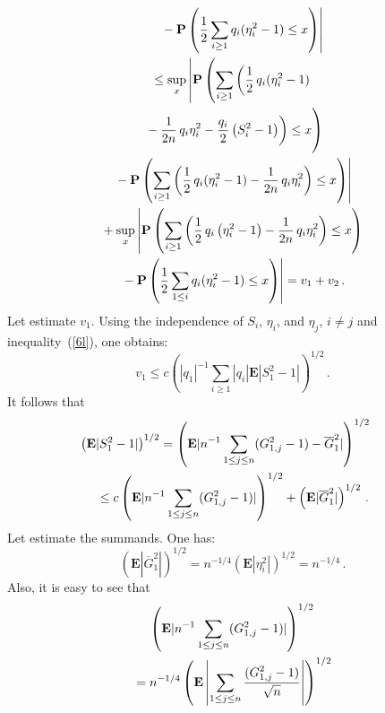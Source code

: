 \begin{multicols}{2}
\noindent
        \begin{multline}
\label{12-y}
\hspace*{5mm}\left.    {}-
    \mathbf{P}\left(\fr{1}{2}\sum\limits_{i\geq 1}q_i(\eta_i^{2}-1)\leq
    x\right)\right\vert \\
{}\leq\sup\limits_{x}\left\vert\mathbf{P}\left(\sum\limits_{i\geq 1}\left(\fr{1}{2}\,q_i
    (\eta_i^{2}-1)\right.\right.\right.\\
\left.\left.    {}-
    \fr{1}{2n}\,q_i\eta_i^{2}-\fr{q_i}{2}\left(S_i^{2}-1\right)
    \right)\leq x     
    \vphantom{\sum\limits_{i\leq1}}
    \right)\\
\left.    {}-
    \mathbf{P}\left(\sum\limits_{i\geq 1}\left(\fr{1}{2}\,q_i(\eta_i^{2}-1)-
    \fr{1}{2n}\,q_i\eta_i^{2}\right)\leq x\right)\right\vert
\\
  {}+\sup\limits_{x}\left\vert\mathbf{P}\left(\sum\limits_{i\geq 1}\left(\fr{1}{2}\,q_i
  \left(\eta_i^{2}-1\right)-
    \fr{1}{2n}\,q_i\eta_i^{2}\right)\leq x\right)\right.\\
\left.    {}-
    \mathbf{P}\left(\fr{1}{2}\sum\limits_{1\leq i}q_i(\eta_i^{2}-1)\leq
    x\right)\right\vert=  v_1+v_2\,.
    \end{multline}
    Let estimate $v_1.$ Using the independence of $S_i$,  $\eta_i$,  and $\eta_j$, $i \neq j$
    and inequality~(\ref{6l}), one obtains:
    $$
    v_1\leq c\left(|q_1|^{-1}\sum\limits_{i\geq 1}|q_i|\mathbf{E}|S_1^{2}-1|\right)^{{1}/{2}}\,.
    $$
    It follows that
    \begin{multline*}
\hspace*{-11.82176pt}\left(\mathbf{E}|S_1^{2}-1|\right)^{{1}/{2}}=\left(\mathbf{E}|
    n^{-1}\sum_{1\leq j\leq n}(G_{1,j}^{2}-1)-\overline{G}_1^{2}|\right)^{{1}/{2}}\\
    {}\leq
    c\left(\mathbf{E}|
    n^{-1}\sum\limits_{1\leq j\leq
    n}(G_{1,j}^{2}-1)|\right)^{{1}/{2}}+\left(\mathbf{E}|\overline{G}_1^{2}|\right)^{{1}/{2}}\,.
    \end{multline*}
    Let estimate the summands. One has:
    $$
    \left(\mathbf{E}|  \overline{G}_1^{2}|\right)^{{1}/{2}}=n^{-1/4}\left(\mathbf{E}|
    \eta_i^{2}|\right)^{{1}/{2}}=n^{-1/4}\,.
    $$
    Also, it is easy to see that
    \begin{multline*}
    \left(\mathbf{E}|n^{-1}\sum\limits_{1\leq j\leq
    n}(G_{1,j}^{2}-1)|\right)^{{1}/{2}}\\
    {}=
    n^{-1/4}\left(\mathbf{E}\left\vert\sum\limits_{1\leq j\leq n}
    \fr{(G_{1,j}^{2}-1)}{\sqrt{n}}\right\vert\right)^{{1}/{2}}\\

\end{multline*}
\end{multicols}
